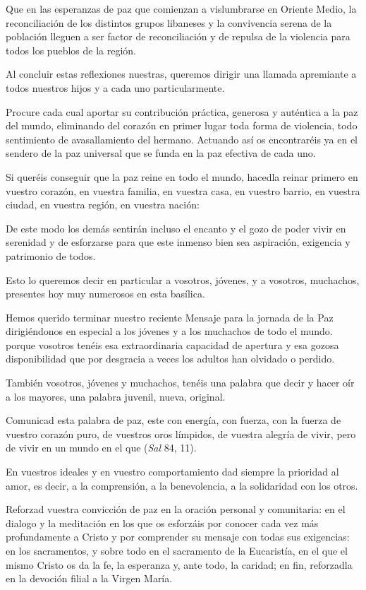 \begin{body}
\begin{body}
Que en las esperanzas de paz que comienzan a vislumbrarse en Oriente Medio, la reconciliación de los distintos grupos libaneses y la convivencia serena de la población lleguen a ser factor de reconciliación y de repulsa de la violencia para todos los pueblos de la región.

Al concluir estas reflexiones nuestras, queremos dirigir una llamada apremiante a todos nuestros hijos y a cada uno particularmente.

Procure cada cual aportar su contribución práctica, generosa y auténtica a la paz del mundo, eliminando del corazón en primer lugar toda forma de violencia, todo sentimiento de avasallamiento del hermano. Actuando así os encontraréis ya en el sendero de la paz universal que se funda en la paz efectiva de cada uno.

Si queréis conseguir que la paz reine en todo el mundo, hacedla reinar primero en vuestro corazón, en vuestra familia, en vuestra casa, en vuestro barrio, en vuestra ciudad, en vuestra región, en vuestra nación:

De este modo los demás sentirán incluso el encanto y el gozo de poder vivir en serenidad y de esforzarse para que este inmenso bien sea aspiración, exigencia y patrimonio de todos.

Esto lo queremos decir en particular a vosotros, jóvenes, y a vosotros, muchachos, presentes hoy muy numerosos en esta basílica.

Hemos querido terminar nuestro reciente Mensaje para la jornada de la Paz dirigiéndonos en especial a los jóvenes y a los muchachos de todo el mundo. porque vosotros tenéis esa extraordinaria capacidad de apertura y esa gozosa disponibilidad que por desgracia a veces los adultos han olvidado o perdido.

También vosotros, jóvenes y muchachos, tenéis una palabra que decir y hacer oír a los mayores, una palabra juvenil, nueva, original.

Comunicad esta palabra de paz, este  con energía, con fuerza, con la fuerza de vuestro corazón puro, de vuestros oros límpidos, de vuestra alegría de vivir, pero de vivir en un mundo en el que  (\emph{Sal} 84, 11).

En vuestros ideales y en vuestro comportamiento dad siempre la prioridad al amor, es decir, a la comprensión, a la benevolencia, a la solidaridad con los otros.

Reforzad vuestra convicción de paz en la oración personal y comunitaria: en el dialogo y la meditación en los que os esforzáis por conocer cada vez más profundamente a Cristo y por comprender su mensaje con todas sus exigencias: en los sacramentos, y sobre todo en el sacramento de la Eucaristía, en el que el mismo Cristo os da la fe, la esperanza y, ante todo, la caridad; en fin, reforzadla en la devoción filial a la Virgen María.


\end{body}
\end{body}
